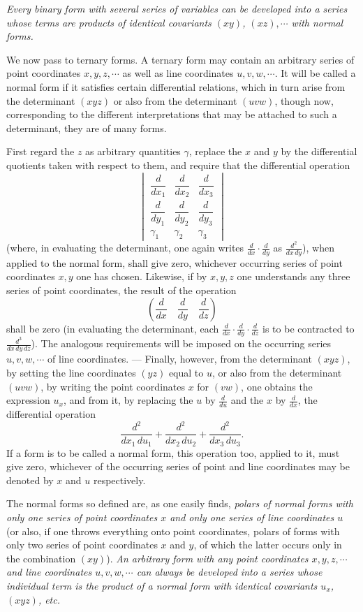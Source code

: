 \documentclass[10pt]{article}
\providecommand{\bdots}{\cdots}
\begin{document}
\textit{Every binary form with several series of variables can be developed into a series whose terms are products of identical covariants $(xy)$, $(xz),\bdots$ with normal forms.}

We now pass to ternary forms. A ternary form may contain an arbitrary series of point coordinates $x,y,z,\bdots$ as well as line coordinates $u,v,w,\bdots$. It will be called a normal form if it satisfies certain differential relations, which in turn arise from the determinant $(xyz)$ or also from the determinant $(uvw)$, though now, corresponding to the different interpretations that may be attached to such a determinant, they are of many forms.

First regard the $z$ as arbitrary quantities $\gamma$, replace the $x$ and $y$ by the differential quotients taken with respect to them, and require that the differential operation
\[
\begin{vmatrix}
\dfrac d{dx_1}&\dfrac d{dx_2}&\dfrac d{dx_3}\\[0.2em]
\dfrac d{dy_1}&\dfrac d{dy_2}&\dfrac d{dy_3}\\[0.2em]
\gamma_1&\gamma_2&\gamma_3
\end{vmatrix}
\]
(where, in evaluating the determinant, one again writes $\frac d{dx}\cdot\frac d{dy}$ as $\frac{d^2}{dx\,dy}$), when applied to the normal form, shall give zero, whichever occurring series of point coordinates $x,y$ one has chosen. Likewise, if by $x,y,z$ one understands any three series of point coordinates, the result of the operation
\[
\left(\frac d{dx}\quad\frac d{dy}\quad\frac d{dz}\right)
\]
shall be zero (in evaluating the determinant, each $\frac d{dx}\cdot\frac d{dy}\cdot\frac d{dz}$ is to be contracted to $\frac{d^3}{dx\,dy\,dz}$). The analogous requirements will be imposed on the occurring series $u,v,w,\bdots$ of line coordinates. --- Finally, however, from the determinant $(xyz)$, by setting the line coordinates $(yz)$ equal to $u$, or also from the determinant $(uvw)$, by writing the point coordinates $x$ for $(vw)$, one obtains the expression $u_x$, and from it, by replacing the $u$ by $\frac d{du}$ and the $x$ by $\frac d{dx}$, the differential operation
\[
\frac{d^2}{dx_1\,du_1}+\frac{d^2}{dx_2\,du_2}+\frac{d^2}{dx_3\,du_3}.
\]
If a form is to be called a normal form, this operation too, applied to it, must give zero, whichever of the occurring series of point and line coordinates may be denoted by $x$ and $u$ respectively.

The normal forms so defined are, as one easily finds, \textit{polars of normal forms with only one series of point coordinates $x$ and only one series of line coordinates $u$} (or also, if one throws everything onto point coordinates, polars of forms with only two series of point coordinates $x$ and $y$, of which the latter occurs only in the combination $(xy)$). \textit{An arbitrary form with any point coordinates $x,y,z,\bdots$ and line coordinates $u,v,w,\bdots$ can always be developed into a series whose individual term is the product of a normal form with identical covariants $u_x$, $(xyz)$, etc.}
\end{document}

